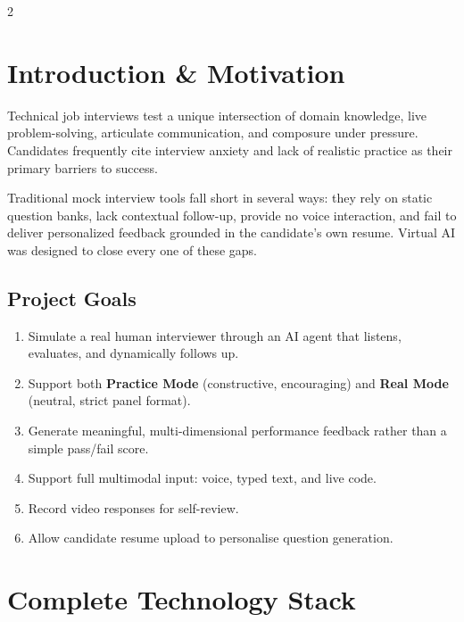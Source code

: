 \documentclass[10pt, a4paper]{article}
\begin{document}
\raggedcolumns
\begin{multicols}{2}

\section{Introduction \& Motivation}

Technical job interviews test a unique intersection of domain knowledge,
live problem-solving, articulate communication, and composure under
pressure. Candidates frequently cite interview anxiety and lack of realistic
practice as their primary barriers to success.

Traditional mock interview tools fall short in several ways: they rely on
static question banks, lack contextual follow-up, provide no voice
interaction, and fail to deliver personalized feedback grounded in the
candidate's own resume. Virtual AI was designed to close every one of these
gaps.

\subsection{Project Goals}
\begin{enumerate}
  \item Simulate a real human interviewer through an AI agent that listens,
        evaluates, and dynamically follows up.
  \item Support both \textbf{Practice Mode} (constructive, encouraging) and
        \textbf{Real Mode} (neutral, strict panel format).
  \item Generate meaningful, multi-dimensional performance feedback rather
        than a simple pass/fail score.
  \item Support full multimodal input: voice, typed text, and live code.
  \item Record video responses for self-review.
  \item Allow candidate resume upload to personalise question generation.
\end{enumerate}

\section{Complete Technology Stack}


\end{multicols}
\end{document}
